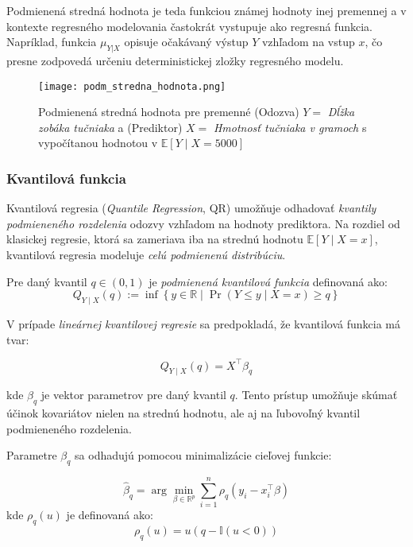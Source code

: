 Podmienená stredná hodnota je teda funkciou známej hodnoty inej premennej a v kontexte regresného modelovania častokrát vystupuje ako regresná funkcia. Napríklad, funkcia $\mu_{Y|X}$ opisuje očakávaný výstup $Y$ vzhľadom na vstup $x$, čo presne zodpovedá určeniu deterministickej zložky regresného modelu.

\begin{figure}[H]
    \centering
    \texttt{[image: podm\_stredna\_hodnota.png]}
    \caption{Podmienená stredná hodnota pre premenné (Odozva) $Y=$ \textit{Dĺžka zobáka tučniaka} a (Prediktor) $X=$ \textit{Hmotnosť tučniaka v gramoch} s vypočítanou hodnotou v $\mathbb{E}[Y \mid X=5000]$}
    \label{fig:cond_mean}
\end{figure}

\subsubsection{Kvantilová funkcia}
\label{subsubsec:conditional_quantile_function}

Kvantilová regresia (\textit{Quantile Regression}, QR) umožňuje odhadovať \textit{kvantily podmieneného rozdelenia} odozvy vzhľadom na hodnoty prediktora. Na rozdiel od klasickej regresie, ktorá sa zameriava iba na strednú hodnotu $\mathbb{E}[Y \mid X = x]$, kvantilová regresia modeluje \textit{celú podmienenú distribúciu}.

Pre daný kvantil $q \in (0,1)$ je \textit{podmienená kvantilová funkcia} definovaná ako:
\begin{equation}
Q_{Y \mid X}(q) := \inf \left\{ y \in \mathbb{R} \mid \Pr(Y \leq y \mid X = x) \geq q \right\}
\end{equation}

V prípade \textit{lineárnej kvantilovej regresie} sa predpokladá, že kvantilová funkcia má tvar:

\begin{equation}
Q_{Y \mid X}(q) = X^\top \beta_q
\end{equation}

kde $\beta_q$ je vektor parametrov pre daný kvantil $q$. Tento prístup umožňuje skúmať účinok kovariátov nielen na strednú hodnotu, ale aj na ľubovoľný kvantil podmieneného rozdelenia.

Parametre $\beta_q$ sa odhadujú pomocou minimalizácie cieľovej funkcie:

\begin{equation}
\hat{\beta}_q = \arg\min_{\beta \in \mathbb{R}^p} \sum_{i=1}^n \rho_q (y_i - x_i^\top \beta)
\end{equation}
kde $\rho_q(u)$ je definovaná ako:
\begin{equation}
\rho_q(u) = u(q - \mathbb{I}(u < 0))
\end{equation}

